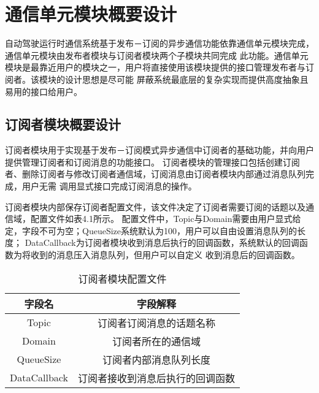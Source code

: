 \section{通信单元模块概要设计}
自动驾驶运行时通信系统基于发布－订阅的异步通信功能依靠通信单元模块完成，通信单元模块由发布者模块与订阅者模块两个子模块共同完成
此功能。通信单元模块是最靠近用户的模块之一，用户将直接使用该模块提供的接口管理发布者与订阅者。该模块的设计思想是尽可能
屏蔽系统最底层的复杂实现而提供高度抽象且易用的接口给用户。
\subsection{订阅者模块概要设计}
订阅者模块用于实现基于发布－订阅模式异步通信中订阅者的基础功能，并向用户提供管理订阅者和订阅消息的功能接口。
订阅者模块的管理接口包括创建订阅者、删除订阅者与修改订阅者通信域，订阅消息由订阅者模块内部通过消息队列完成，用户无需
调用显式接口完成订阅消息的操作。

订阅者模块内部保存订阅者配置文件，该文件决定了订阅者需要订阅的话题以及通信域，配置文件如表4.1所示。
配置文件中，Topic与Domain需要由用户显式给定，字段不可为空；QueueSize系统默认为100，用户可以自由设置消息队列的长度；
DataCallback为订阅者模块收到消息后执行的回调函数，系统默认的回调函数为将收到的消息压入消息队列，但用户可以自定义
收到消息后的回调函数。
\begin{table}[htb]
  \centering\small
  \caption{订阅者模块配置文件}
  \label{tab:exampletable}
  \begin{tabular}{cc}
    \toprule
    字段名 & 字段解释 \\
    \midrule
    Topic & 订阅者订阅消息的话题名称\\
    Domain & 订阅者所在的通信域\\
    QueueSize & 订阅者内部消息队列长度\\
    DataCallback & 订阅者接收到消息后执行的回调函数\\
    \bottomrule
  \end{tabular}
\end{table}


